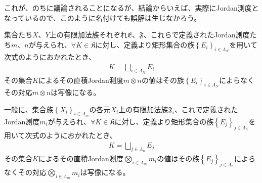 \documentclass[dvipdfmx]{jsarticle}
\begin{document}
これが、のちに議論されることになるが、結論からいえば、実際にJordan測度となっているので、このように名付けても誤解は生じなかろう。
\begin{thm}\label{4.5.7.1}
集合たち$X$、$Y$上の有限加法族それぞれ$\mathfrak{E}$、$\mathfrak{F}$、これらで定義されたJordan測度たち$m$、$n$が与えられ、$\forall K \in \mathfrak{K}$に対し、定義より矩形集合の族$\left\{ E_{i} \right\}_{i \in \varLambda_{N}}$を用いて次式のようにおかれたとき、
\begin{align*}
K = \bigsqcup_{i \in \varLambda_{N}} E_{i}
\end{align*}
その集合$K$によるその直積Jordan測度$m \otimes n$の値はその族$\left\{ E_{i} \right\}_{i \in \varLambda_{N}}$によらなくその対応$m \otimes n$は写像になる。\par
一般に、集合族$\left\{ X_{i} \right\}_{i \in \varLambda_{m}}$の各元$X_{i}$上の有限加法族$\mathfrak{F}_{i}$、これで定義されたJordan測度$m_{i}$が与えられ、$\forall K \in \mathfrak{K}$に対し、定義より矩形集合の族$\left\{ E_{j} \right\}_{j \in \varLambda_{n} }$を用いて次式のようにおかれたとき、
\begin{align*}
K = \bigsqcup_{j \in \varLambda_{n} } E_{j}
\end{align*}
その集合$K$によるその直積Jordan測度$\bigotimes_{i \in \varLambda_{m} } m_{i}$の値はその族$\left\{ E_{j} \right\}_{j \in \varLambda_{n}}$によらなくその対応$\bigotimes_{i \in \varLambda_{m}} m_{i}$は写像になる。
\end{thm}
\end{document}
